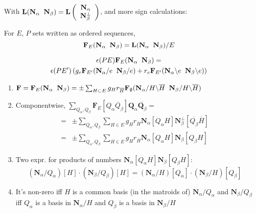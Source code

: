 \documentclass{beamer}
\newcommand{\ext}[1]{\ensuremath{\mathbf{#1}}}
\begin{document}
\begin{frame}
\end{frame}




\begin{frame}
  With $\ext{L}(\eNal\;\; \eNbe)=\ext{L}\left(\begin{array}{c}\eNal \\ \eNbePe \end{array} \right)$, and more sign calculations:
    \begin{definition}
      For $E$, $P$ sets written as ordered sequences,
      \[
      \ext{F}_E(\eNal\;\;\eNbe) = \ext{L}(\eNal\;\;\eNbe)/E
      \]
    \end{definition}
    \begin{theorem}
      \begin{multline*}
        \epsilon(PE)\ext{F}_E(\eNal\;\;\eNbe)=\\
        \epsilon(PE')
        \left(g_e\ext{F}_{E'}(\eNal/e\;\; \eNbe/e) +
      r_e\ext{F}_{E'}(\eNal\backslash e\;\; \eNbe\backslash e)\right)
      \end{multline*}
  \end{theorem}

\end{frame}

\begin{frame}
  \begin{corollary}
    \begin{enumerate}
      \item
       $
       \ext{F}=\ext{F}_E(\eNal\;\;\eNbe) =
          \pm\sum_{H\subset E}g_H r_{\overline{H}}
       \ext{F}_\emptyset
       (\ext{N}_\alpha /H \backslash\overline{H} \;\;
        \ext{N}_\beta/H\backslash\overline{H})
        $
     \item
       Componentwise, $\sum_{Q_\alpha,Q_\beta} \ext{F}_E[Q_\alpha \overline{Q}_\beta]
       \ext{Q}_\alpha\overline{\ext{Q}_\beta}=$
       \[
       \begin{split}
       =&\pm\sum_{Q_\alpha,Q_\beta}\sum_{H\in E} g_H r_{\overline{H}}
       \ext{N}_\alpha[Q_\alpha H]
       \ext{N}_\beta^\perp[\overline{Q_\beta}\overline{H}]\\
       =&
       \pm\sum_{Q_\alpha,Q_\beta}\sum_{H\in E}g_H r_{\overline{H}}
       \ext{N}_\alpha[Q_\alpha H]
       \ext{N}_\beta[Q_\beta H]
       \end{split}
       \]
     \item
       Two expr. for  products of numbers  $\ext{N}_\alpha[Q_\alpha H]
       \ext{N}_\beta[Q_\beta H]$:
       \[
       (\ext{N}_\alpha/Q_\alpha)[H]\cdot (\ext{N}_\beta/Q_\beta)[H]
       =
        (\ext{N}_\alpha/H)[Q_\alpha]\cdot (\ext{N}_\beta/H)[Q_\beta]
       \]
     \item
       It's non-zero iff $H$  is a common basis (in the matroids of)
       $\ext{N}_\alpha/Q_\alpha$ and $\ext{N}_\beta/Q_\beta$\\
       iff $Q_\alpha$ is a basis in $\ext{N}_\alpha/H$ and
       $Q_\beta$ is a basis in $\ext{N}_\beta/H$
    \end{enumerate}
  \end{corollary}
\end{frame}
\end{document}
